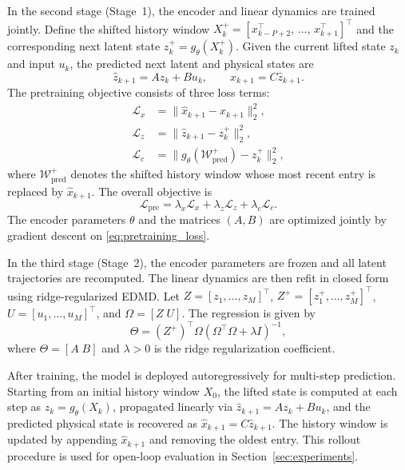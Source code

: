\documentclass[journal]{IEEEtran}
\begin{document}
In the second stage (Stage~1), the encoder and linear dynamics are trained jointly. Define the shifted history window $X_k^{+} = [x_{k-P+2}^\top,\,\ldots,\,x_{k+1}^\top]^\top$ and the corresponding next latent state $z_k^{+} = g_\theta(X_k^{+})$. Given the current lifted state $z_k$ and input $u_k$, the predicted next latent and physical states are
\begin{equation}
    \hat{z}_{k+1} = A z_k + B u_k,
    \qquad
    \hat{x}_{k+1} = C \hat{z}_{k+1}.
\end{equation}
The pretraining objective consists of three loss terms:
\begin{align}
    \mathcal{L}_{x} &= \|\hat{x}_{k+1}-x_{k+1}\|_2^2, \label{eq:loss_x}\\
    \mathcal{L}_{z} &= \|\hat{z}_{k+1}-z_k^{+}\|_2^2, \label{eq:loss_z}\\
    \mathcal{L}_{c} &= \bigl\|g_\theta(\mathcal{W}^{+}_{\mathrm{pred}})-z_k^{+}\bigr\|_2^2, \label{eq:loss_c}
\end{align}
where $\mathcal{W}^{+}_{\mathrm{pred}}$ denotes the shifted history window whose most recent entry is replaced by $\hat{x}_{k+1}$. The overall objective is
\begin{equation}
    \mathcal{L}_{\mathrm{pre}} = \lambda_x \mathcal{L}_x + \lambda_z \mathcal{L}_z + \lambda_c \mathcal{L}_c.
    \label{eq:pretraining_loss}
\end{equation}
The encoder parameters $\theta$ and the matrices $(A,B)$ are optimized jointly by gradient descent on \eqref{eq:pretraining_loss}.

In the third stage (Stage~2), the encoder parameters are frozen and all latent trajectories are recomputed. The linear dynamics are then refit in closed form using ridge-regularized EDMD. Let $Z = [z_1,\ldots,z_M]^\top$, $Z^{+} = [z_1^{+},\ldots,z_M^{+}]^\top$, $U = [u_1,\ldots,u_M]^\top$, and $\Omega = [Z\;U]$. The regression is given by
\begin{equation}
    \Theta = (Z^{+})^\top \Omega \left(\Omega^\top \Omega + \lambda I\right)^{-1},
    \label{eq:edmd_solution}
\end{equation}
where $\Theta = [A\;B]$ and $\lambda > 0$ is the ridge regularization coefficient.

After training, the model is deployed autoregressively for multi-step prediction. Starting from an initial history window $X_0$, the lifted state is computed at each step as $z_k = g_\theta(X_k)$, propagated linearly via $\hat{z}_{k+1} = A z_k + B u_k$, and the predicted physical state is recovered as $\hat{x}_{k+1} = C\hat{z}_{k+1}$. The history window is updated by appending $\hat{x}_{k+1}$ and removing the oldest entry. This rollout procedure is used for open-loop evaluation in Section~\ref{sec:experiments}.
\end{document}
